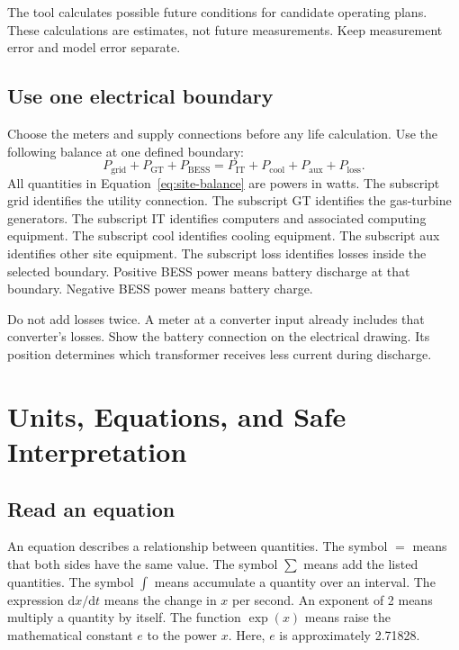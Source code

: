 \documentclass[11pt,a4paper]{report}
\newcommand{\dd}{\mathrm{d}}
\begin{document}
The tool calculates possible future conditions for candidate operating plans.
These calculations are estimates, not future measurements.
Keep measurement error and model error separate.

\section{Use one electrical boundary}
Choose the meters and supply connections before any life calculation.
Use the following balance at one defined boundary:
\begin{equation}
P_{\mathrm{grid}}+P_{\mathrm{GT}}+P_{\mathrm{BESS}}
=P_{\mathrm{IT}}+P_{\mathrm{cool}}+P_{\mathrm{aux}}+P_{\mathrm{loss}}.
\label{eq:site-balance}
\end{equation}
All quantities in Equation~\ref{eq:site-balance} are powers in watts.
The subscript grid identifies the utility connection.
The subscript GT identifies the gas-turbine generators.
The subscript IT identifies computers and associated computing equipment.
The subscript cool identifies cooling equipment.
The subscript aux identifies other site equipment.
The subscript loss identifies losses inside the selected boundary.
Positive BESS power means battery discharge at that boundary.
Negative BESS power means battery charge.

Do not add losses twice.
A meter at a converter input already includes that converter's losses.
Show the battery connection on the electrical drawing.
Its position determines which transformer receives less current during discharge.

\chapter{Units, Equations, and Safe Interpretation}
\label{chap:foundations}
\section{Read an equation}
An equation describes a relationship between quantities.
The symbol $=$ means that both sides have the same value.
The symbol $\sum$ means add the listed quantities.
The symbol $\int$ means accumulate a quantity over an interval.
The expression $\dd x/\dd t$ means the change in $x$ per second.
An exponent of 2 means multiply a quantity by itself.
The function $\exp(x)$ means raise the mathematical constant $e$ to the power $x$.
Here, $e$ is approximately 2.71828.
\end{document}
